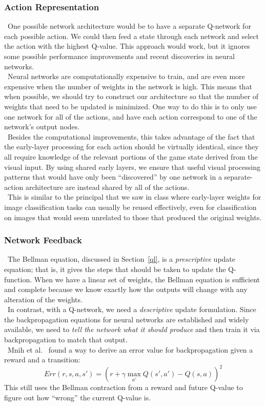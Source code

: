 \documentclass[conference]{IEEEtran}
\begin{document}
\subsubsection{Action Representation}
\noindent\ One possible network architecture would be to have a separate
Q-network for each possible action. We could then feed a state through each
network and select the action with the highest Q-value. This approach would
work, but it ignores some possible performance improvements and recent
discoveries in neural networks.\\
\indent\ Neural networks are computationally expensive to train, and are even
more expensive when the number of weights in the network is high. This means
that when possible, we should try to construct our architecture so that the
number of weights that need to be updated is minimized. One way to do this is
to only use one network for all of the actions, and have each action correspond
to one of the network's output nodes.\\
\indent\ Besides the computational improvements, this takes advantage of the
fact that the early-layer processing for each action should be virtually
identical, since they all require knowledge of the relevant portions of the
game state derived from the visual input.  By using shared early layers, we
ensure that useful visual processing patterns that would have only been
``discovered'' by one network in a separate-action architecture are instead
shared by all of the actions.\\
\indent\ This is similar to the principal that we saw in class where
early-layer weights for image classification tasks can usually be reused
effectively, even for classification on images that would seem unrelated to
those that produced the original weights.

\subsubsection{Network Feedback}
\noindent\ The Bellman equation, discussed in Section~\ref{ql}, is a
\emph{prescriptive} update equation; that is, it gives the steps that should be
taken to update the Q-function. When we have a linear set of weights, the
Bellman equation is sufficient and complete because we know exactly how the
outputs will change with any alteration of the weights.\\
\indent\ In contrast, with a Q-network, we need a \emph{descriptive} update
formulation.  Since the backpropagation equations for neural networks are
established and widely available, we need to \emph{tell the network what it
should produce} and then train it via backpropagation to match that output.\\
\indent\ Mnih et al.~\cite{mnih2013playing} found a way to derive an error
value for backpropagation given a reward and a transition:
\begin{equation}
    Err(r, s, a, s')={\left(r+\gamma\max_{a'}Q(s',a')-Q(s,a)\right)}^{2}
\end{equation}
This still uses the Bellman contraction from a reward and future Q-value to
figure out how ``wrong'' the current Q-value is.
\end{document}
